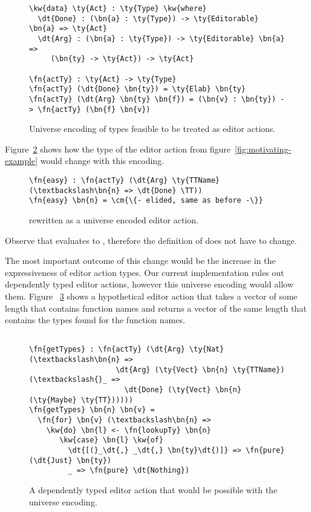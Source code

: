 \begin{figure}[H]
\begin{Verbatim}
\kw{data} \ty{Act} : \ty{Type} \kw{where}
  \dt{Done} : (\bn{a} : \ty{Type}) -> \ty{Editorable} \bn{a} => \ty{Act}
  \dt{Arg} : (\bn{a} : \ty{Type}) -> \ty{Editorable} \bn{a} =>
     (\bn{ty} -> \ty{Act}) -> \ty{Act}

\fn{actTy} : \ty{Act} -> \ty{Type}
\fn{actTy} (\dt{Done} \bn{ty}) = \ty{Elab} \bn{ty}
\fn{actTy} (\dt{Arg} \bn{ty} \bn{f}) = (\bn{v} : \bn{ty}) -> \fn{actTy} (\bn{f} \bn{v})
\end{Verbatim}
\caption{Universe encoding of types feasible to be treated as editor actions.}
\label{code:universe}
\end{figure}

Figure~\ref{code:universe-example} shows how the type of the  editor
action from figure~\ref{fig:motivating-example} would change with this encoding.

\begin{figure}[H]
\begin{Verbatim}
\fn{easy} : \fn{actTy} (\dt{Arg} \ty{TTName} (\textbackslash\bn{n} => \dt{Done} \TT))
\fn{easy} \bn{n} = \cm{\{- elided, same as before -\}}
\end{Verbatim}
\caption{ rewritten as a universe encoded editor action.}
\label{code:universe-example}
\end{figure}

Observe that  evaluates
to , therefore the definition of  does
not have to change.

The most important outcome of this change would be the increase in the
expressiveness of editor action types. Our current implementation rules out
dependently typed editor actions, however this universe encoding would allow
them. Figure ~\ref{code:universe-dependent} shows a
hypothetical editor action that takes a vector of some length that contains
function names and returns a vector of the same length that contains the types
found for the function names.

\begin{figure}[H]
\begin{Verbatim}

\fn{getTypes} : \fn{actTy} (\dt{Arg} \ty{Nat} (\textbackslash\bn{n} =>
                    \dt{Arg} (\ty{Vect} \bn{n} \ty{TTName}) (\textbackslash{}_ =>
                      \dt{Done} (\ty{Vect} \bn{n} (\ty{Maybe} \ty{TT})))))
\fn{getTypes} \bn{n} \bn{v} =
  \fn{for} \bn{v} (\textbackslash\bn{n} =>
    \kw{do} \bn{l} <- \fn{lookupTy} \bn{n}
       \kw{case} \bn{l} \kw{of}
         \dt{[(}_\dt{,} _\dt{,} \bn{ty}\dt{)]} => \fn{pure} (\dt{Just} \bn{ty})
         _ => \fn{pure} \dt{Nothing})
\end{Verbatim}
\caption{A dependently typed editor action that would be possible with the universe encoding.}
\label{code:universe-dependent}
\end{figure}

